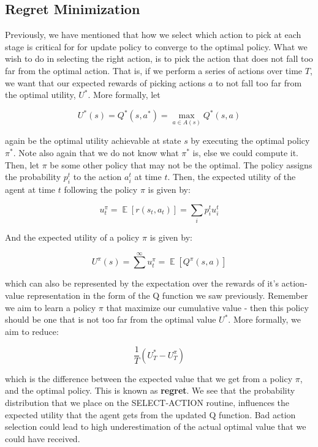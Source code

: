\documentclass[12pt]{article}
\DeclareMathOperator{\E}{\mathbb{E}}
\begin{document}
\subsection{Regret Minimization}

Previously, we have mentioned that how we select which action to pick at each stage is critical for for update policy to converge to the optimal policy.  What we wish to do in selecting the right action, is to pick the action that does not fall too far from the optimal action. That is, if we perform a series of actions over time $T$, we want that our expected rewards of picking actions $a$ to not fall too far from the optimal utility, $U^*$. More formally, let

\begin{equation*}
U^*(s) = Q^*(s, a^*) = \max_{a \in A(s)} Q^*(s, a)
\end{equation*}

again be the optimal utility achievable at state $s$ by executing the optimal policy $\pi^*$. Note also again that we do not know what $\pi^*$ is, else we could compute it. Then, let $\pi$ be some other policy that may not be the optimal. The policy assigns the probability $p^t_i$ to the action $a^t_i$ at time $t$. Then, the expected utility of the agent at time $t$ following the policy $\pi$ is given by:

\begin{equation*}
u^{\pi}_t = \E[r(s_t, a_t)] = \sum_i p^t_i u^t_i
\end{equation*}

And the expected utility of a policy $\pi$ is given by:

\begin{equation*}
U^{\pi}(s) = \sum^{\infty} u^{\pi}_t = \E[Q^{\pi}(s, a)]
\end{equation*}

which can also be represented by the expectation over the rewards of it's action-value representation in the form of the Q function we saw previously. Remember we aim to learn a policy $\pi$ that maximize our cumulative value - then this policy should be one that is not too far from the optimal value $U^*$. More formally, we aim to reduce:

\begin{equation*}
\frac{1}{T}(U^*_T - U^{\pi}_T)
\end{equation*}

which is the difference between the expected value that we get from a policy $\pi$, and the optimal policy. This is known as \textbf{regret}. We see that the probability distribution that we place on the \textsc{SELECT-ACTION} routine, influences the expected utility that the agent gets from the updated Q function. Bad action selection could lead to high underestimation of the actual optimal value that we could have received.
\end{document}
